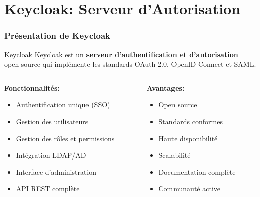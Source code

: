 \documentclass[aspectratio=169]{beamer}
\begin{document}
\section{Keycloak: Serveur d'Autorisation}

\begin{frame}
    \frametitle{Présentation de Keycloak}
    \begin{block}{Keycloak}
        Keycloak est un \textbf{serveur d'authentification et d'autorisation} open-source qui implémente les standards OAuth 2.0, OpenID Connect et SAML.
    \end{block}
    
    \begin{columns}
        \begin{column}{0.5\textwidth}
            \textbf{Fonctionnalités:}
            \begin{itemize}
                \item Authentification unique (SSO)
                \item Gestion des utilisateurs
                \item Gestion des rôles et permissions
                \item Intégration LDAP/AD
                \item Interface d'administration
                \item API REST complète
            \end{itemize}
        \end{column}
        \begin{column}{0.5\textwidth}
            \textbf{Avantages:}
            \begin{itemize}
                \item Open source
                \item Standards conformes
                \item Haute disponibilité
                \item Scalabilité
                \item Documentation complète
                \item Communauté active
            \end{itemize}
        \end{column}
    \end{columns}
\end{frame}
\end{document}
